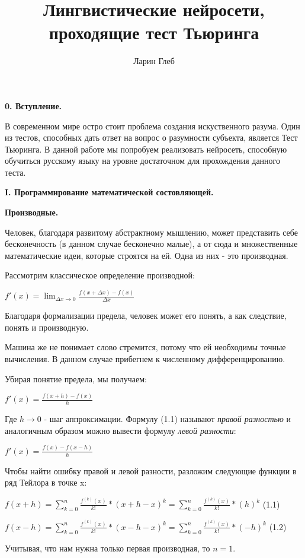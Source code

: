 \documentclass[12pt]{extarticle}
\title{Лингвистические нейросети, проходящие тест Тьюринга}
\author{Ларин Глеб}
\begin{document}
\maketitle
	\centerline{\textbf{0. Вступление.}}
	В современном мире остро стоит проблема создания искуственного разума. Один из тестов, способных дать ответ на вопрос о разумности субъекта, является Тест Тьюринга. В данной работе мы попробуем реализовать нейросеть, способную обучиться русскому языку на уровне достаточном для прохождения данного теста.
	
	\centerline{\textbf{I. Программирование математической состовляющей.}}
	\centerline{\textbf{Производные.}}
	Человек, благодаря развитому абстрактному мышлению, может представить себе бесконечность (в данном случае бесконечно малые), а от сюда и множественные математические идеи, которые строятся на ей. Одна из них - это производная. \newline
	
	Рассмотрим классическое определение производной:
	
	\centerline{$f'(x) = \displaystyle\lim_{\Delta x\to0} \frac{f(x+\Delta x) - f(x)}{\Delta x} $} 
	
	Благодаря формализации предела, человек может его понять, а как следствие, понять и производную. \newline
	
	Машина же не понимает слово стремится, потому что ей необходимы точные вычисления. В данном случае прибегнем к численному дифференцированию. 
	
	Убирая понятие предела, мы получаем:
	
	\centerline{$f'(x) = \frac{f(x+h) - f(x)}{h} $} 
	
	Где $h \rightarrow 0$ - шаг аппроксимации. \newpage
	Формулу (1.1) называют \textit{правой разностью} и аналогичным образом можно вывести формулу \textit{левой разности}:
	
	\centerline{$f'(x) = \frac{f(x) - f(x-h)}{h}$} 
	
	Чтобы найти ошибку правой и левой разности, разложим следующие функции в ряд Тейлора в точке x:
	
	\centerline{$f(x+h) = \displaystyle \sum_{k=0}^{n} \frac{f^{(k)}(x)}{k!}*(x+h-x)^k=\displaystyle \sum_{k=0}^{n} \frac{f^{(k)}(x)}{k!}*(h)^k$ (1.1)} 
	\centerline{$f(x-h) = \displaystyle \sum_{k=0}^{n} \frac{f^{(k)}(x)}{k!}*(x-h-x)^k=\displaystyle \sum_{k=0}^{n} \frac{f^{(k)}(x)}{k!}*(-h)^k$ (1.2)}
	
	Учитывая, что нам нужна только первая производная, то $n=1$. 
	
\end{document}

